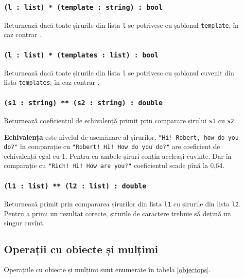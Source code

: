 \subsubsection{\texttt{(l : list) * (template : string) : bool}}

Returnează \true{} dacă toate șirurile din lista \texttt{l} se potrivesc cu șablonul \texttt{template}, în caz contrar \false{}.

\subsubsection{\texttt{(l : list) * (templates : list) : bool}}

Returnează \true{} dacă toate șirurile din lista \texttt{l} se potrivesc cu șablonul cuvenit din lista \texttt{templates}, în caz contrar \false{}.

\subsubsection{\texttt{(s1 : string) ** (s2 : string) : double}}

Returnează coeficientul de echivalență primit prin comparare șirului \texttt{s1} cu \texttt{s2}.

{\bf Echivalența} este nivelul de asemănare al șirurilor. \texttt{"Hi! Robert, how do you do?"} în comparație cu \texttt{"Robert! Hi! How do you do?"} are coeficient de echivalență egal cu 1. Pentru ca ambele șiruri conțin aceleași cuvinte. Dar în comparație cu  \texttt{"Rich! Hi! How are you?"} coeficientul scade pînă la 0,64.

\subsubsection{\texttt{(l1 : list) ** (l2 : list) : double}}

Returnează primit prin compararea șirurilor din lista \texttt{l1} cu șirurile din lista \texttt{l2}.
Pentru a primi un rezultat corecte, șirurile de caractere trebuie să dețină un singur cuvînt.

\subsection{Operații cu obiecte și mulțimi}

Operațiile cu obiecte și mulțimi sunt enumerate în tabela \ref{objectops}.

